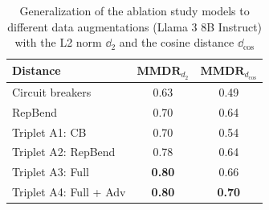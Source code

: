 \documentclass[11pt]{article}
\begin{document}
\begin{table}[tbp]
\centering
{}
\caption{REINFORCE-GCG attack success rate with the HarmBench (HB) and StrongREJECT (SR) judge classifiers for our Llama 3 8B Instruct ablation models without adversarial hard negative mining. HarmBench validation set ($81$ behaviors). The ASR is higher when more loss terms are ablated.
}
\label{tab:reinforce_and_gcg}
\end{table}

\begin{table}[ht]
\centering
\setlength{\tabcolsep}{2pt}
\begin{tabular}{lcc}
\hline
\textbf{Distance} & {$\mathbf{MMDR}_{d_2}$} & {$\mathbf{MMDR}_{d_\mathrm{cos}}$} \\
\hline
Circuit breakers & 0.63 & 0.49 \\
RepBend & 0.70 & 0.64 \\
\hline
Triplet A1: CB & 0.70 & 0.54 \\
Triplet A2: RepBend & 0.78 & 0.64 \\
Triplet A3: Full & \textbf{0.80} & 0.66 \\
Triplet A4: Full + Adv & \textbf{0.80} & \textbf{0.70} \\
\hline
\end{tabular}
\caption{
Generalization of the ablation study models to different data augmentations (Llama 3 8B Instruct) with the L2 norm $\dd_2$ and the cosine distance $\dd_\mathrm{cos}$
}
\label{tab:generalization_ablation}
\end{table}
\end{document}
